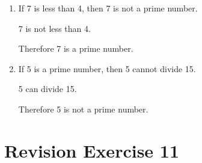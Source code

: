 \documentclass{report}
\begin{document}
\begin{enumerate}[leftmargin=*]
\begin{enumerate}[leftmargin=*]
              \item If 7 is less than 4, then 7 is not a prime number.

                    7 is not less than 4.

                    Therefore 7 is a prime number.

              \item If 5 is a prime number, then 5 cannot divide 15.

                    5 can divide 15.

                    Therefore 5 is not a prime number.
          \end{enumerate}
\end{enumerate}

\section*{Revision Exercise 11}
\end{document}
